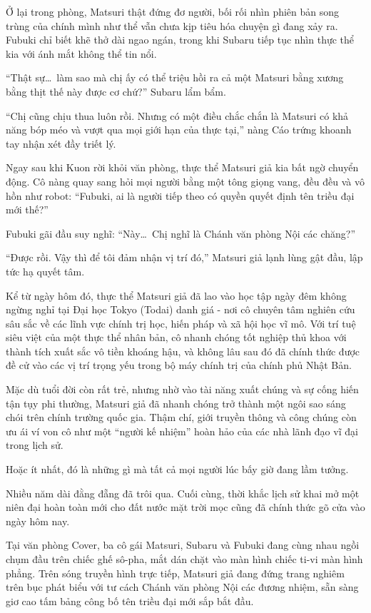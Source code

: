 \documentclass[../main.tex]{subfiles}
\begin{document}
Ở lại trong phòng, Matsuri thật đứng đơ người, bối rối nhìn phiên bản song trùng của chính mình như thể vẫn chưa kịp tiêu hóa chuyện gì đang xảy ra. Fubuki chỉ biết khẽ thở dài ngao ngán, trong khi Subaru tiếp tục nhìn thực thể kia với ánh mắt không thể tin nổi.

``Thật sự\dots\ làm sao mà chị ấy có thể triệu hồi ra cả một Matsuri bằng xương bằng thịt thế này được cơ chứ?'' Subaru lẩm bẩm.

``Chị cũng chịu thua luôn rồi. Nhưng có một điều chắc chắn là Matsuri có khả năng bóp méo và vượt qua mọi giới hạn của thực tại,'' nàng Cáo trứng khoanh tay nhận xét đầy triết lý.

Ngay sau khi Kuon rời khỏi văn phòng, thực thể Matsuri giả kia bất ngờ chuyển động. Cô nàng quay sang hỏi mọi người bằng một tông giọng vang, đều đều và vô hồn như robot: ``Fubuki, ai là người tiếp theo có quyền quyết định tên triều đại mới thế?''

Fubuki gãi đầu suy nghĩ: ``Này\dots\ Chị nghĩ là Chánh văn phòng Nội các chăng?''

``Được rồi. Vậy thì để tôi đảm nhận vị trí đó,'' Matsuri giả lạnh lùng gật đầu, lập tức hạ quyết tâm.

Kể từ ngày hôm đó, thực thể Matsuri giả đã lao vào học tập ngày đêm không ngừng nghỉ tại Đại học Tokyo (Todai) danh giá - nơi cô chuyên tâm nghiên cứu sâu sắc về các lĩnh vực chính trị học, hiến pháp và xã hội học vĩ mô. Với trí tuệ siêu việt của một thực thể nhân bản, cô nhanh chóng tốt nghiệp thủ khoa với thành tích xuất sắc vô tiền khoáng hậu, và không lâu sau đó đã chính thức được đề cử vào các vị trí trọng yếu trong bộ máy chính trị của chính phủ Nhật Bản.

Mặc dù tuổi đời còn rất trẻ, nhưng nhờ vào tài năng xuất chúng và sự cống hiến tận tụy phi thường, Matsuri giả đã nhanh chóng trở thành một ngôi sao sáng chói trên chính trường quốc gia. Thậm chí, giới truyền thông và công chúng còn ưu ái ví von cô như một ``người kế nhiệm'' hoàn hảo của các nhà lãnh đạo vĩ đại trong lịch sử.

Hoặc ít nhất, đó là những gì mà tất cả mọi người lúc bấy giờ đang lầm tưởng.

\ct

Nhiều năm dài đằng đẵng đã trôi qua. Cuối cùng, thời khắc lịch sử khai mở một niên đại hoàn toàn mới cho đất nước mặt trời mọc cũng đã chính thức gõ cửa vào ngày hôm nay.

Tại văn phòng Cover, ba cô gái Matsuri, Subaru và Fubuki đang cùng nhau ngồi chụm đầu trên chiếc ghế sô-pha, mắt dán chặt vào màn hình chiếc ti-vi màn hình phẳng. Trên sóng truyền hình trực tiếp, Matsuri giả đang đứng trang nghiêm trên bục phát biểu với tư cách Chánh văn phòng Nội các đương nhiệm, sẵn sàng giơ cao tấm bảng công bố tên triều đại mới sắp bắt đầu.
\end{document}
